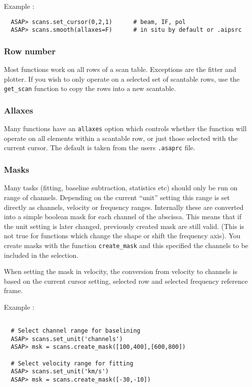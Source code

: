 \documentclass[11pt]{article}
\newcommand{\cmd}[1]{{\tt #1}}
\begin{document}
Example :

\begin{verbatim}
  ASAP> scans.set_cursor(0,2,1)      # beam, IF, pol
  ASAP> scans.smooth(allaxes=F)      # in situ by default or .aipsrc
\end{verbatim}

\subsubsection{Row number}

Most functions work on all rows of a scan table. Exceptions are the
fitter and plotter. If you wish to only operate on a selected set of
scantable rows, use the \cmd{get\_scan} function to copy the rows into
a new scantable.

\subsubsection{Allaxes}

Many functions have an \cmd{allaxes} option which controls whether the
function will operate on all elements within a scantable row, or just
those selected with the current cursor. The default is taken from the
users {\tt .asaprc} file.

\subsubsection{Masks}

Many tasks (fitting, baseline subtraction, statistics etc) should only
be run on range of channels. Depending on the current ``unit'' setting
this range is set directly as channels, velocity or frequency
ranges. Internally these are converted into a simple boolean mask for
each channel of the abscissa. This means that if the unit setting is
later changed, previously created mask are still valid. (This is not
true for functions which change the shape or shift the frequency axis).
You create masks with the function \cmd{create\_mask} and this specified
the channels to be included in the selection.

When setting the mask in velocity, the conversion from velocity
to channels is based on the current cursor setting, selected row and
selected frequency reference frame.

Example :
\begin{verbatim}

  # Select channel range for baselining
  ASAP> scans.set_unit('channels')
  ASAP> msk = scans.create_mask([100,400],[600,800])
 
  # Select velocity range for fitting
  ASAP> scans.set_unit('km/s')
  ASAP> msk = scans.create_mask([-30,-10])
\end{verbatim}
\end{document}
